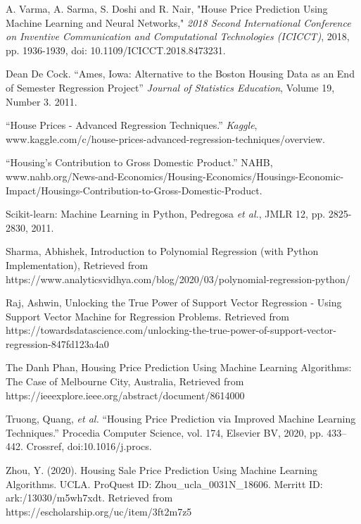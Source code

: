 \documentclass[12pt]{article}
\begin{document}
A. Varma, A. Sarma, S. Doshi and R. Nair, "House Price Prediction Using Machine Learning and Neural Networks," \emph{2018 Second International Conference on Inventive Communication and Computational Technologies (ICICCT)}, 2018, pp. 1936-1939, doi: 10.1109/ICICCT.2018.8473231.

Dean De Cock. “Ames, Iowa: Alternative to the Boston Housing Data as an End of Semester Regression Project” \emph{Journal of Statistics Education}, Volume 19, Number 3. 2011.

“House Prices - Advanced Regression Techniques.” \emph{Kaggle}, www.kaggle.com/c/house-prices-advanced-regression-techniques/overview.

“Housing's Contribution to Gross Domestic Product.” NAHB, www.nahb.org/News-and-Economics/Housing-Economics/Housings-Economic-Impact/Housings-Contribution-to-Gross-Domestic-Product.

Scikit-learn: Machine Learning in Python, Pedregosa \emph{et al.}, JMLR 12, pp. 2825-2830, 2011.

Sharma, Abhishek, Introduction to Polynomial Regression (with Python Implementation), Retrieved from https://www.analyticsvidhya.com/blog/2020/03/polynomial-regression-python/

Raj, Ashwin, Unlocking the True Power of Support Vector Regression - Using Support Vector Machine for Regression Problems. Retrieved from https://towardsdatascience.com/unlocking-the-true-power-of-support-vector-regression-847fd123a4a0

The Danh Phan, Housing Price Prediction Using Machine Learning Algorithms: The Case of Melbourne City, Australia, Retrieved from https://ieeexplore.ieee.org/abstract/document/8614000

Truong, Quang, \emph{et al.} “Housing Price Prediction via Improved Machine Learning Techniques.” Procedia Computer Science, vol. 174, Elsevier BV, 2020, pp. 433–442. Crossref, doi:10.1016/j.procs.

Zhou, Y. (2020). Housing Sale Price Prediction Using Machine Learning Algorithms. UCLA. ProQuest ID: Zhou\_ucla\_0031N\_18606. Merritt ID: ark:/13030/m5wh7xdt. Retrieved from https://escholarship.org/uc/item/3ft2m7z5

\endgroup
\end{document}
